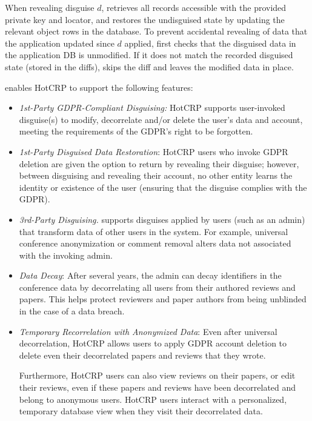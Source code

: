 When revealing disguise $d$, \sys retrieves all records accessible with
the provided private key and locator, and restores the undisguised state
by updating the relevant object rows in the database.
%
To prevent accidental revealing of data that the application updated
since $d$ applied, \sys first checks that the disguised data in the
application DB is unmodified.
%
If it does not match the recorded disguised state (stored in the diffs),
\sys skips the diff and leaves the modified data in place.
%


\iffalse
\sys enables HotCRP to support the following features:
\begin{itemize}
    \item\emph{1st-Party GDPR-Compliant Disguising:}
HotCRP supports user-invoked disguise(s) to modify, decorrelate and/or delete the user's data and
account, meeting the requirements of the GDPR's right to be forgotten.

    \item \emph{1st-Party Disguised Data Restoration}: HotCRP users who invoke GDPR deletion are given the
        option to return by revealing their disguise; however, between disguising and revealing
        their account, no other entity learns the identity or existence of the user (ensuring that
        the disguise complies with the GDPR).

    \item\emph{3rd-Party Disguising.}
\sys supports disguises applied by users (such as an admin) that transform data of other users in the system. For example, universal conference anonymization or
    comment removal alters data not associated with the invoking admin.

\item \emph{Data Decay}: After several years, the admin can decay identifiers in the conference data
    by decorrelating all users from their authored reviews and papers.  This helps protect reviewers
        and paper authors from being unblinded in the case of a data breach.

\item \emph{Temporary Recorrelation with Anonymized Data}:
Even after universal decorrelation, HotCRP allows users to apply GDPR account
deletion to delete even their decorrelated papers and reviews that they wrote.
%

%
Furthermore, HotCRP users can also view reviews on their papers, or edit their reviews, even if
        these papers and reviews have been decorrelated and belong to anonymous users.  HotCRP users
        interact with a personalized, temporary database view when they visit their decorrelated
        data.


\end{itemize}
